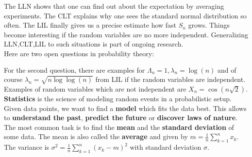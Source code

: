 \documentclass[12pt]{amsart}
\newcounter{example}    \def\example#1{ \item \fontsize{12}{15} \selectfont #1 \fontsize{12}{15} \selectfont }
\begin{document}



\hspace{4mm} 

The LLN shows that one can find out about the expectation by averaging experiments. 
The CLT explains why one sees the standard normal distribution so often.
The LIL finally gives us a precise estimate how fast $S_n$ grows. 
Things become interesting if the random variables are no more independent. Generalizing LLN,CLT,LIL
to such situations is part of ongoing research. \\

Here are two open questions in probability theory: 

\begin{center}
 \end{center}

For the second question, there are examples for $\Lambda_n=1,\lambda_n=\log(n)$ and of course $\lambda_n=\sqrt{n \log \log(n)}$
from LIL if the random variables are independent. Examples of random variables which are not independent are $X_n = \cos(n \sqrt{2})$. \\

{\bf Statistics} is the science of modeling random events in a probabilistic setup. Given data points, we want
to find a {\bf model} which fits the data best. This allows to {\bf understand the past}, {\bf predict the future} 
or {\bf discover laws of nature}. The most common task is to find the {\bf mean} and the {\bf standard deviation} of some
data. The mean is also called the {\bf average} and given by $m=\frac{1}{n} \sum_{k=1}^n x_k$. The variance is
$\sigma^2= \frac{1}{n} \sum_{k=1}^{n} (x_k-m)^2$ with standard deviation $\sigma$. \\
\end{document}
